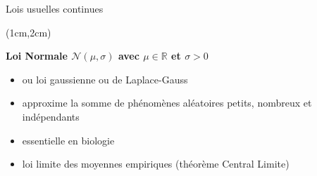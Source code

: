 \documentclass{beamer}
\begin{document}
\begin{frame}{Lois usuelles continues}
\begin{textblock*}{\textwidth}(1cm,2cm)

\begin{center}{\bf \Large Loi Normale $\mathcal{N}(\mu,\sigma)$ avec $\mu\in \mathbb{R}$ et $\sigma>0$} \end{center}
\begin{itemize}
\item ou loi gaussienne ou de Laplace-Gauss
\item approxime la somme de phénomènes aléatoires petits, nombreux et indépendants
\item essentielle en biologie  
\item loi limite des moyennes empiriques (théorème Central Limite)
\end{itemize}

 \end{textblock*}

\end{frame} 

\end{document}
